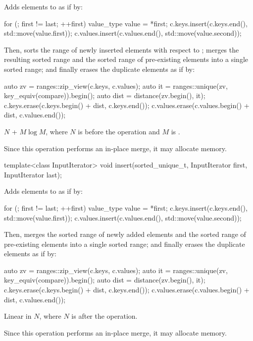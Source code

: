 \begin{itemdescr}
\pnum
\effects
Adds elements to  as if by:
\begin{codeblock}
for (; first != last; ++first) {
  value_type value = *first;
  c.keys.insert(c.keys.end(), std::move(value.first));
  c.values.insert(c.values.end(), std::move(value.second));
}
\end{codeblock}
Then, sorts the range of newly inserted elements
with respect to ;
merges the resulting sorted range and
the sorted range of pre-existing elements into a single sorted range; and
finally erases the duplicate elements as if by:
\begin{codeblock}
auto zv = ranges::zip_view(c.keys, c.values);
auto it = ranges::unique(zv, key_equiv(compare)).begin();
auto dist = distance(zv.begin(), it);
c.keys.erase(c.keys.begin() + dist, c.keys.end());
c.values.erase(c.values.begin() + dist, c.values.end());
\end{codeblock}

\pnum
\complexity
$N$ + $M \log M$,
where $N$ is  before the operation and
$M$ is .

\pnum
\remarks
Since this operation performs an in-place merge, it may allocate memory.
\end{itemdescr}

%
\begin{itemdecl}
template<class InputIterator>
  void insert(sorted_unique_t, InputIterator first, InputIterator last);
\end{itemdecl}

\begin{itemdescr}
\pnum
\effects
Adds elements to  as if by:
\begin{codeblock}
for (; first != last; ++first) {
  value_type value = *first;
  c.keys.insert(c.keys.end(), std::move(value.first));
  c.values.insert(c.values.end(), std::move(value.second));
}
\end{codeblock}
Then, merges the sorted range of newly added elements and
the sorted range of pre-existing elements into a single sorted range; and
finally erases the duplicate elements as if by:
\begin{codeblock}
auto zv = ranges::zip_view(c.keys, c.values);
auto it = ranges::unique(zv, key_equiv(compare)).begin();
auto dist = distance(zv.begin(), it);
c.keys.erase(c.keys.begin() + dist, c.keys.end());
c.values.erase(c.values.begin() + dist, c.values.end());
\end{codeblock}

\pnum
\complexity
Linear in $N$, where $N$ is  after the operation.

\pnum
\remarks
Since this operation performs an in-place merge, it may allocate memory.
\end{itemdescr}

